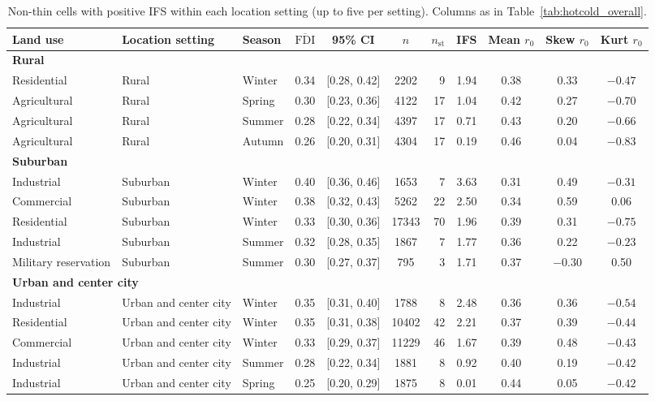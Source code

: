 \documentclass[a4paper,fleqn]{cas-sc}
\begin{document}
\begin{table}[!htbp]
\centering
\scriptsize
\caption{Non-thin cells with positive IFS within each location setting (up to five per setting). Columns as in Table~\ref{tab:hotcold_overall}.}
\label{tab:hotcold_by_loc}
\begin{tabular}{lllcccrrccc}
\toprule
\textbf{Land use} & \textbf{Location setting} & \textbf{Season} & \textbf{$\overline{\mathrm{FDI}}$} & \textbf{95\% CI} & \textbf{$n$} & \textbf{$n_{\mathrm{st}}$} & \textbf{IFS} & \textbf{Mean $r_0$} & \textbf{Skew $r_0$} & \textbf{Kurt $r_0$} \\
\midrule
\multicolumn{11}{l}{\textbf{Rural}} \\
Residential & Rural & Winter & 0.34 & [0.28, 0.42] & 2202 & 9 & 1.94 & 0.38 & 0.33 & $-0.47$ \\
Agricultural & Rural & Spring & 0.30 & [0.23, 0.36] & 4122 & 17 & 1.04 & 0.42 & 0.27 & $-0.70$ \\
Agricultural & Rural & Summer & 0.28 & [0.22, 0.34] & 4397 & 17 & 0.71 & 0.43 & 0.20 & $-0.66$ \\
Agricultural & Rural & Autumn & 0.26 & [0.20, 0.31] & 4304 & 17 & 0.19 & 0.46 & 0.04 & $-0.83$ \\
\midrule
\multicolumn{11}{l}{\textbf{Suburban}} \\
Industrial & Suburban & Winter & 0.40 & [0.36, 0.46] & 1653 & 7 & 3.63 & 0.31 & 0.49 & $-0.31$ \\
Commercial & Suburban & Winter & 0.38 & [0.32, 0.43] & 5262 & 22 & 2.50 & 0.34 & 0.59 & 0.06 \\
Residential & Suburban & Winter & 0.33 & [0.30, 0.36] & 17343 & 70 & 1.96 & 0.39 & 0.31 & $-0.75$ \\
Industrial & Suburban & Summer & 0.32 & [0.28, 0.35] & 1867 & 7 & 1.77 & 0.36 & 0.22 & $-0.23$ \\
Military reservation & Suburban & Summer & 0.30 & [0.27, 0.37] & 795 & 3 & 1.71 & 0.37 & $-0.30$ & 0.50 \\
\midrule
\multicolumn{11}{l}{\textbf{Urban and center city}} \\
Industrial & Urban and center city & Winter & 0.35 & [0.31, 0.40] & 1788 & 8 & 2.48 & 0.36 & 0.36 & $-0.54$ \\
Residential & Urban and center city & Winter & 0.35 & [0.31, 0.38] & 10402 & 42 & 2.21 & 0.37 & 0.39 & $-0.44$ \\
Commercial & Urban and center city & Winter & 0.33 & [0.29, 0.37] & 11229 & 46 & 1.67 & 0.39 & 0.48 & $-0.43$ \\
Industrial & Urban and center city & Summer & 0.28 & [0.22, 0.34] & 1881 & 8 & 0.92 & 0.40 & 0.19 & $-0.42$ \\
Industrial & Urban and center city & Spring & 0.25 & [0.20, 0.29] & 1875 & 8 & 0.01 & 0.44 & 0.05 & $-0.42$ \\
\bottomrule
\end{tabular}
\end{table}
\end{document}
